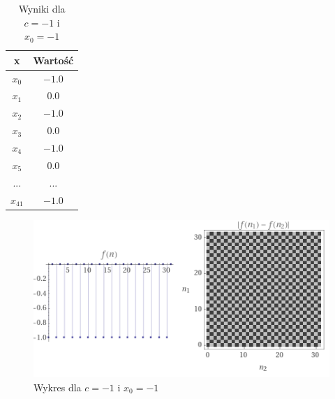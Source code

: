 \documentclass[a4paper,14pt]{report}
\begin{document}
    \begin{table}[H]
    \centering
    \begin{tabular}{|c | c |} 
     \hline
     x & Wartość \\ [0.5ex]
     \hline\hline
     $x_{0}$ & $-1.0$ \\
     $x_{1}$ & $0.0$ \\
     $x_{2}$ & $-1.0$ \\
     $x_{3}$ & $0.0$ \\
     $x_{4}$ & $-1.0$  \\
     $x_{5}$ & $0.0$ \\
     ... & ... \\
     $x_{41}$ & $-1.0 $ \\
     \hline
    \end{tabular}
    \caption{Wyniki dla $c=-1$ i $x_{0}=-1$}
    \label{Zad6e}
    \end{table}
    \begin{figure}[H]
      \includegraphics[scale=1.0]{wykresZad6e}
      \centering
      \caption{Wykres dla $c=-1$ i $x_{0}=-1$}
    \end{figure}
\end{document}
